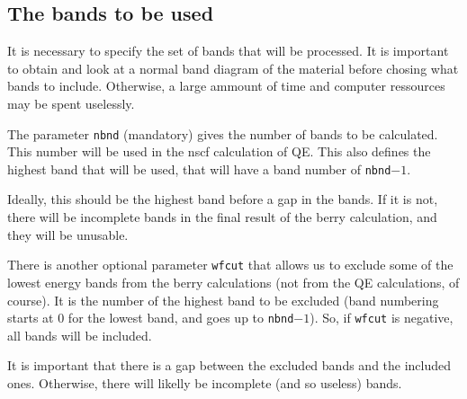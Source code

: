 \documentclass[a4paper,12pt]{report}
\begin{document}
\bigskip

 \subsection{The bands to be used}

 It is necessary to specify the set of bands that will be processed.
 It is important to obtain and look at a normal band diagram of the material before chosing
 what bands to include.
 Otherwise, a large ammount of time and computer ressources may be spent uselessly.

 The parameter \verb|nbnd| (mandatory) gives the number of bands to be calculated.
 This number will be used in the nscf calculation of QE.
 This also defines the highest band that will be used, that will have a band number of \verb|nbnd|$-1$.

 Ideally, this should be the highest band before a gap in the bands.
 If it is not, there will be incomplete bands in the final result of the berry calculation,
 and they will be unusable.

 There is another optional parameter \verb|wfcut| that allows us to exclude some of the lowest energy bands
 from the berry calculations (not from the QE calculations, of course).
 It is the number of the highest band to be excluded
 (band numbering starts at 0 for the lowest band, and goes up to \verb|nbnd|$-1$).
 So, if \verb|wfcut| is negative, all bands will be included.

 It is important that there is a gap between the excluded bands and the included ones.
 Otherwise, there will likelly be incomplete (and so useless) bands.
















\newpage
\end{document}
